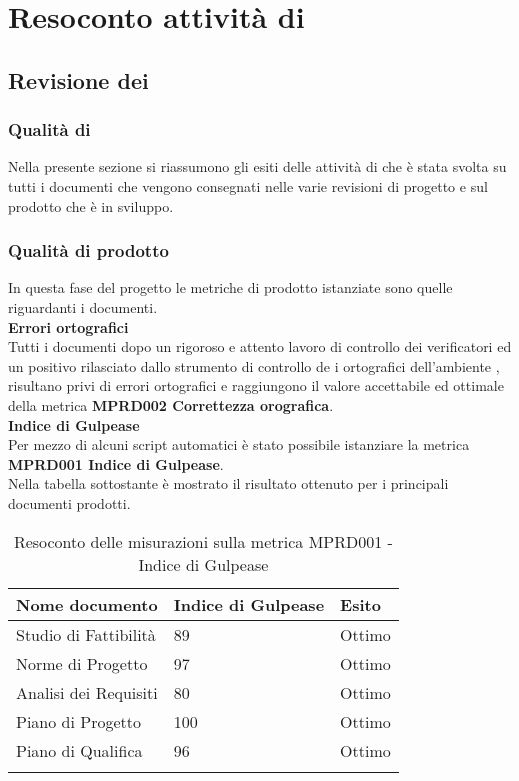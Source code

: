 \clearpage
\appendix
\section{Resoconto attività di }
\subsection{Revisione dei }
\subsubsection{Qualità di }
Nella presente sezione si riassumono gli esiti delle attività di  che è stata svolta su tutti i documenti che vengono consegnati nelle varie revisioni di progetto e sul prodotto  che è in sviluppo.
\subsubsection{Qualità di prodotto}
In questa fase del progetto le metriche di prodotto istanziate sono quelle riguardanti i documenti.\\[0.4cm]
\textbf{Errori ortografici}\\[0.4cm]
Tutti i documenti dopo un rigoroso e attento lavoro di controllo dei verificatori ed un  positivo rilasciato dallo strumento di controllo de i ortografici dell'ambiente , risultano privi di errori ortografici e raggiungono il valore accettabile ed ottimale della metrica  \textbf{MPRD002 Correttezza orografica}.
\\[0.4cm]\textbf{Indice di Gulpease}\\[0.4cm]
Per mezzo di alcuni script automatici è stato possibile istanziare la metrica  \textbf{MPRD001 Indice di Gulpease}.\\
Nella tabella sottostante è mostrato il risultato ottenuto per i principali documenti prodotti.
\begin{center}
	\centering
	\renewcommand{\arraystretch}{1.5}
	\begin{longtable}{  p{5cm}  p{5cm} p{3cm}  }
		\rowcolor{tableHeadYellow}
		\textbf{Nome documento}   & \textbf{Indice di \mbox{Gulpease}} & \textbf{Esito} \\ 
		\endhead
		Studio di Fattibilità     & 89                                 & Ottimo \\
		Norme di Progetto         & 97                                 & Ottimo \\
		Analisi dei Requisiti     & 80                                 & Ottimo \\
		Piano di Progetto         & 100                                & Ottimo \\
		Piano di Qualifica        & 96                                 & Ottimo \\
		\rowcolor{white}
		\caption{Resoconto delle misurazioni sulla metrica MPRD001 - Indice di Gulpease}
	\end{longtable}
\end{center}
